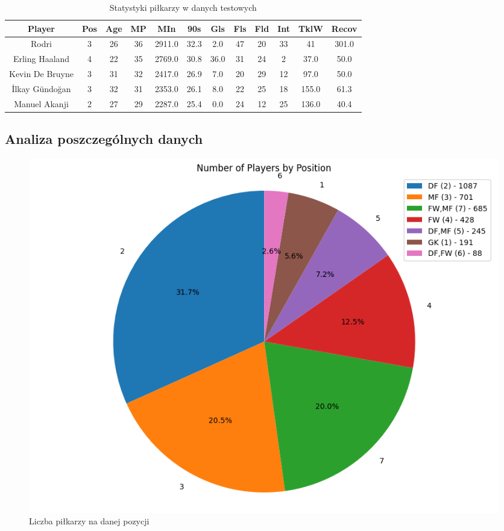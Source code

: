 \documentclass{article}
\begin{document}
\begin{table}[H]
    \centering
    \begin{tabular}{|c|c|c|c|c|c|c|c|c|c|c|c|}
    \hline
    Player & Pos & Age & MP & MIn & 90s & Gls & Fls & Fld & Int & TklW & Recov \\
    \hline
    Rodri & 3 & 26 & 36 & 2911.0 & 32.3 & 2.0 & 47 & 20 & 33 & 41 & 301.0 \\ \hline
    Erling Haaland & 4 & 22 & 35 & 2769.0 & 30.8 & 36.0 & 31 & 24 & 2 & 37.0 & 50.0 \\ \hline
    Kevin De Bruyne & 3 & 31 & 32 & 2417.0 & 26.9 & 7.0 & 20 & 29 & 12 & 97.0 & 50.0 \\ \hline
    İlkay Gündoğan & 3 & 32 & 31 & 2353.0 & 26.1 & 8.0 & 22 & 25 & 18 & 155.0 & 61.3 \\ \hline
    Manuel Akanji & 2 & 27 & 29 & 2287.0 & 25.4 & 0.0 & 24 & 12 & 25 & 136.0 & 40.4 \\
    \hline
    \end{tabular}
    \caption{Statystyki piłkarzy w danych testowych}
\end{table}

\subsection{Analiza poszczególnych danych}

\begin{figure}[H]
    \centering
    \includegraphics[scale=0.5]{players_by_position.png}
    \caption{Liczba piłkarzy na danej pozycji}
    \label{img:photo1}
\end{figure}
\end{document}
